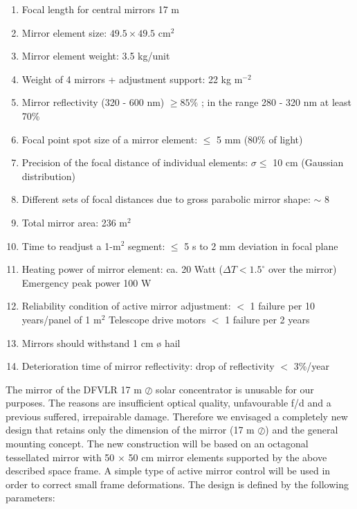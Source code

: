 \begin{enumerate}
\item  Focal length for central mirrors 17 m

\item  Mirror element size: $49.5\times 49.5$ cm$^{2}$

\item  Mirror element weight: 3.5 kg/unit

\item  Weight of 4 mirrors + adjustment support: 22 kg m$^{-2}$

\item  Mirror reflectivity (320 - 600 nm) $\geq 85\%$ ; in the range 280 -
320 nm at least 70\%

\item  Focal point spot size of a mirror element: $\leq $ 5 mm (80\% of
light)

\item  Precision of the focal distance of individual elements: $\sigma \leq $
10 cm (Gaussian distribution)

\item  Different sets of focal distances due to gross parabolic mirror
shape: $\sim $ 8

\item  Total mirror area: 236 m$^{2}$

\item  Time to readjust a 1-m$^{2}$ segment: $\leq $ 5 s to 2 mm
deviation in focal plane

\item  Heating power of mirror element: ca. 20 Watt ($\Delta T<1.5^{\circ }$
over  the mirror)\newline
Emergency peak power 100 W 

\item  Reliability condition of active mirror adjustment: $<$ 1 failure per
10 years/panel of 1 m$^{2}$\newline
Telescope drive motors $<$ 1 failure per 2 years

\item  Mirrors should withstand 1 cm {\o} hail

\item  Deterioration time of mirror reflectivity: drop of reflectivity $<$
3\%/year
\end{enumerate}

The mirror of the DFVLR 17 m $\oslash$ solar concentrator is unusable for
our purposes. The reasons are insufficient optical quality, unfavourable f/d
and a previous suffered, irrepairable damage. Therefore we envisaged a
completely new design that retains only the dimension of the mirror (17 m $%
\oslash$) and the general mounting concept. The new construction will be
based on an octagonal tessellated mirror with 50 $\times$ 50 cm mirror
elements supported by the above described space frame. A simple type of
active mirror control will be used in order to correct small frame
deformations. The design is defined by the following parameters:

